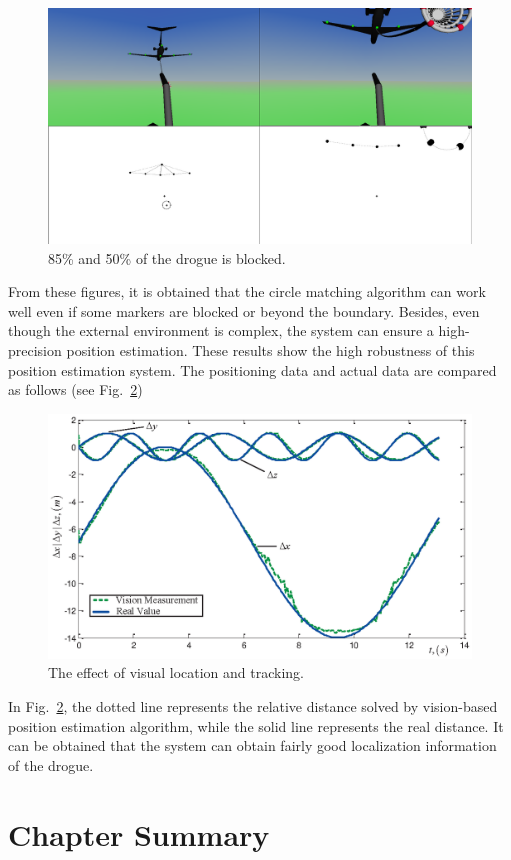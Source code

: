 \begin{figure}[!htb]
	\centering
	\includegraphics[width=0.7\hsize]{Figures/Figs_Ch6/fangzhen23.eps}
	\caption{85\% and 50\% of the drogue is blocked.}
	\label{fig6}
\end{figure}

From these figures, it is obtained that the circle matching algorithm can
work well even if some markers are blocked or beyond the boundary. Besides, even
though the external environment is complex, the system can ensure a
high-precision position estimation. These results show the high
robustness of this position estimation system. The positioning data and
actual data are compared as follows (see Fig.~\ref{fig8}) 
\begin{figure}[!htb]
	\centering
	\includegraphics[width=0.7\hsize]{Figures/Figs_Ch6/duibi1.eps}
	\caption{The effect of visual location and tracking.}
	\label{fig8}
\end{figure}

In Fig.~\ref{fig8}, the dotted line represents the relative distance solved
by vision-based position estimation algorithm, while the solid line
represents the real distance. It can be obtained that the system can obtain fairly good localization information of
the drogue.

\section{Chapter Summary}

